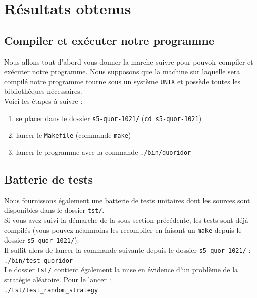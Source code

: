 \documentclass[12pt,a4paper]{article}
\begin{document}
\section{Résultats obtenus}

\subsection{Compiler et exécuter notre programme}

Nous allons tout d'abord vous donner la marche suivre pour pouvoir compiler
et exécuter notre programme. Nous supposons que la machine sur laquelle sera
compilé notre programme tourne sous un système \texttt{UNIX} et possède toutes 
les bibliothèques nécessaires.
\\

Voici les étapes à suivre :
\begin{enumerate}
  \item se placer dans le dossier \texttt{s5-quor-1021/} (\verb,cd s5-quor-1021,)
  \item lancer le \texttt{Makefile} (commande \texttt{make}) 
  \item lancer le programme avec la commande \texttt{./bin/quoridor} \\
\end{enumerate}

\subsection{Batterie de tests}

Nous fournissons également une batterie de tests unitaires dont les sources sont
 disponibles dans le dossier \verb,tst/,.\\

Si vous avez suivi la démarche de la sous-section précédente, les tests sont déjà compilés
(vous pouvez néanmoins les recompiler en faisant un \verb,make, depuis le dossier 
\texttt{s5-quor-1021/}). \\

Il suffit alors de lancer la commande suivante depuis le dossier 
\texttt{s5-quor-1021/} : \\
\verb,./bin/test_quoridor,\\

Le dossier \verb,tst/, contient également la mise en évidence d'un problème de la stratégie 
aléatoire. Pour le lancer :\\
\verb,./tst/test_random_strategy,\\
\end{document}
